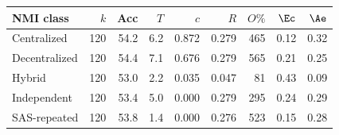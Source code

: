 \begin{tabular}{@{}lrrrrrrrr@{}}
\toprule
NMI class & $k$ & Acc & $T$ & $c$ & $R$ & $O\%$ & $\Ec$ & $\Ae$ \\
\midrule
Centralized & 120 & 54.2 & 6.2 & 0.872 & 0.279 & 465 & 0.12 & 0.32 \\
Decentralized & 120 & 54.4 & 7.1 & 0.676 & 0.279 & 565 & 0.21 & 0.25 \\
Hybrid & 120 & 53.0 & 2.2 & 0.035 & 0.047 & 81 & 0.43 & 0.09 \\
Independent & 120 & 53.4 & 5.0 & 0.000 & 0.279 & 295 & 0.24 & 0.29 \\
SAS-repeated & 120 & 53.8 & 1.4 & 0.000 & 0.276 & 523 & 0.15 & 0.28 \\
\bottomrule
\end{tabular}